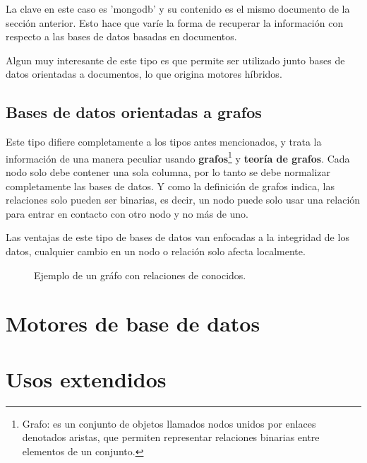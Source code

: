 La clave en este caso es 'mongodb' y su contenido es el mismo documento de la secci\'on anterior. Esto hace que var\'ie la forma de recuperar la informaci\'on con respecto a las bases de datos basadas en documentos.

Algun muy interesante de este tipo es que permite ser utilizado junto bases de datos orientadas a documentos, lo que origina motores h\'ibridos.

\subsection{Bases de datos orientadas a grafos}

Este tipo difiere completamente a los tipos antes mencionados, y trata la informaci\'on de una manera peculiar usando \textbf{grafos}\footnote{Grafo: es un conjunto de objetos llamados nodos unidos por enlaces denotados aristas, que permiten representar relaciones binarias entre elementos de un conjunto.} y \textbf{teor\'ia de grafos}. Cada nodo solo debe contener una sola columna, por lo tanto se debe normalizar completamente las bases de datos. Y como la definici\'on de grafos indica, las relaciones solo pueden ser binarias, es decir, un nodo puede solo usar una relaci\'on para entrar en contacto con otro nodo y no m\'as de uno.

Las ventajas de este tipo de bases de datos van enfocadas a la integridad de los datos, cualquier cambio en un nodo o relaci\'on solo afecta localmente.

\begin{figure}[!ht]
    \centering
     \caption[Bases de datos en grafo]{Ejemplo de un gr\'afo con relaciones de conocidos.}
\end{figure}

\section{Motores de base de datos}

\section{Usos extendidos}
